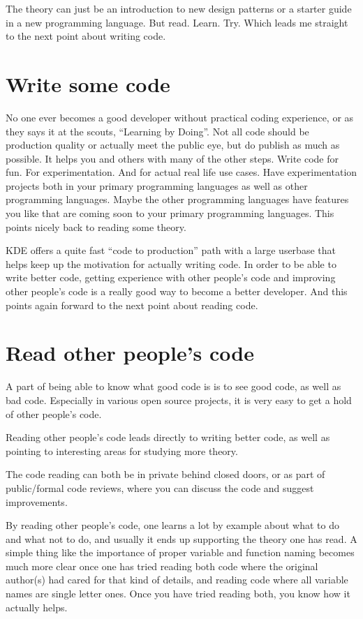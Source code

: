The theory can just be an introduction to new design patterns or a starter guide in a new programming language. But read. Learn. Try. Which leads me straight to the next point about writing code.

\section*{Write some code}
No one ever becomes a good developer without practical coding experience, or as they says it at the scouts, “Learning by Doing”. Not all code should be production quality or actually meet the public eye, but do publish as much as possible. It helps you and others with many of the other steps. Write code for fun. For experimentation. And for actual real life use cases. Have experimentation projects both in your primary programming languages as well as other programming languages. Maybe the other programming languages have features you like that are coming soon to your primary programming languages. This points nicely back to reading some theory.

KDE offers a quite fast “code to production” path with a large userbase that helps keep up the motivation for actually writing code.
In order to be able to write better code, getting experience with other people's code and improving other people's code is a really good way to become a better developer. And this points again forward to the next point about reading code.

\section*{Read other people's code}
A part of being able to know what good code is is to see good code, as well as bad code. Especially in various open source projects, it is very easy to get a hold of other people's code.

Reading other people's code leads directly to writing better code, as well as pointing to interesting areas for studying more theory.

The code reading can both be in private behind closed doors, or as part of public/formal code reviews, where you can discuss the code and suggest improvements.

By reading other people's code, one learns a lot by example about what to do and what not to do, and usually it ends up supporting the theory one has read. A simple thing like the importance of proper variable and function naming becomes much more clear once one has tried reading both code where the original author(s) had cared for that kind of details, and reading code where all variable names are single letter ones. Once you have tried reading both, you know how it actually helps.

